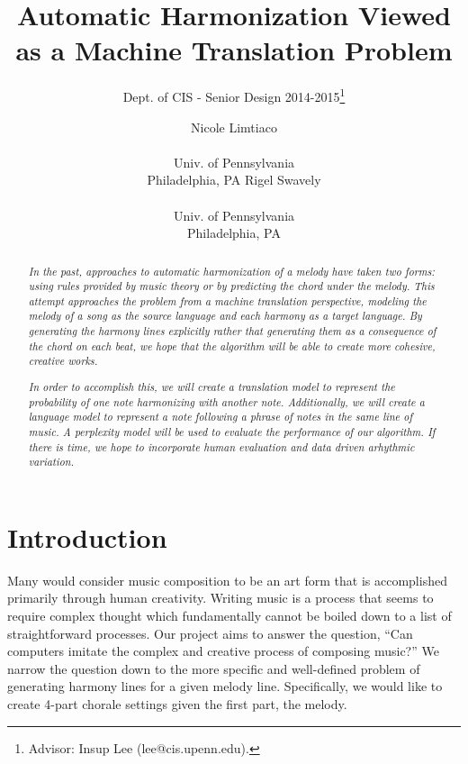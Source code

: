 \documentclass{sig-alternate}
\begin{document}
 

\title{Automatic Harmonization Viewed as a Machine Translation Problem}
\subtitle{Dept. of CIS - Senior Design 2014-2015\thanks{Advisor: Insup Lee (lee@cis.upenn.edu).}}
\author{
\alignauthor Nicole Limtiaco \\  \\ Univ. of Pennsylvania \\ Philadelphia, PA
\alignauthor Rigel Swavely \\  \\ Univ. of Pennsylvania \\ Philadelphia, PA}
\date{}
\maketitle

\begin{abstract}
  \textit{In the past, approaches to automatic harmonization of a melody
  have taken two forms: using rules provided by music theory or by predicting
  the chord under the melody. This attempt approaches the problem from a machine translation perspective, 
  modeling the melody of a song as the source language and each harmony as a target language.
  By generating the harmony lines explicitly rather that generating them as a
  consequence of the chord on each beat, we hope that the algorithm will be able to create
  more cohesive, creative works.}

  \textit{In order to accomplish this, we will create a translation model to represent the probability
  of one note harmonizing with another note. Additionally, we will create a language model to represent
  a note following a phrase of notes in the same line of music. A perplexity model will be used to 
  evaluate the performance of our algorithm. If there is time, we hope to incorporate human evaluation
  and data driven arhythmic variation.}
\end{abstract}

\section{Introduction}
\label{sec:intro}
Many would consider music composition to be an art form that is accomplished
primarily through human creativity. Writing music is a process that seems to require
complex thought which fundamentally cannot be boiled down to a list of straightforward
processes. Our project aims to answer the question, ``Can computers imitate the complex
and creative process of composing music?'' We narrow the question down to the more specific
and well-defined problem of generating harmony lines for a given melody line. Specifically,
we would like to create 4-part chorale settings given the first part, the melody.
\end{document}
